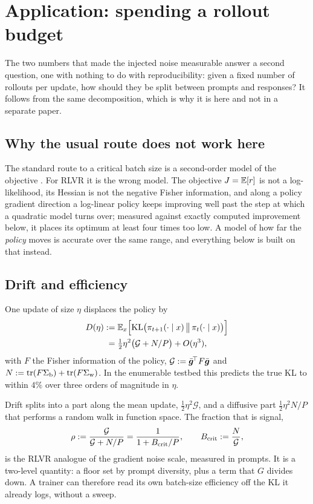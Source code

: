 \section{Application: spending a rollout budget}
\label{sec:applications}

The two numbers that made the injected noise measurable answer a second question, one with nothing
to do with reproducibility: given a fixed number of rollouts per update, how should they be split
between prompts and responses? It follows from the same decomposition, which is why it is here and
not in a separate paper.
\label{sec:drift}

\subsection{Why the usual route does not work here}

The standard route to a critical batch size is a second-order model of the objective
\citep{mccandlish2018empirical}. For RLVR it is the wrong model. The objective $J = \mathbb{E}[r]$ is not a
log-likelihood, its Hessian is not the negative Fisher information, and along a policy gradient
direction a log-linear policy keeps improving well past the step at which a quadratic model turns
over; measured against exactly computed improvement below, it places its optimum at least four
times too low. A model of how far the \emph{policy} moves is accurate over
the same range, and everything below is built on that instead.

\subsection{Drift and efficiency}

One update of size $\eta$ displaces the policy by
\begin{align}
  \label{eq:drift}
  D(\eta) &:= \mathbb{E}_x\Big[ \mathrm{KL}\big( \pi_{t+1}(\cdot \mid x) \,\big\|\, \pi_t(\cdot \mid x) \big) \Big]
  \notag \\
  &\;= \tfrac{1}{2}\eta^2 \big( \mathcal{G} + N/P \big) + O(\eta^3),
\end{align}
with $F$ the Fisher information of the policy, $\mathcal{G} := \bar{\bm{g}}^{\!\top} F \bar{\bm{g}}$ and
$N := \operatorname{tr}(F\Sigma_{\mathrm{b}}) + \operatorname{tr}(F\Sigma_{\mathrm{w}})$. In the enumerable testbed this predicts the true KL to within $4\%$
over three orders of magnitude in $\eta$.

Drift splits into a part along the mean update, $\tfrac{1}{2}\eta^2\mathcal{G}$, and a diffusive
part $\tfrac{1}{2}\eta^2 N/P$ that performs a random walk in function space. The fraction that is
signal,
\begin{equation}
  \label{eq:efficiency}
  \rho := \frac{\mathcal{G}}{\mathcal{G} + N/P} = \frac{1}{1 + B_{\mathrm{crit}}/P},
  \qquad
  B_{\mathrm{crit}} := \frac{N}{\mathcal{G}},
\end{equation}
is the RLVR analogue of the gradient noise scale, measured in prompts. It is a two-level quantity:
a floor set by prompt diversity, plus a term that $G$ divides down. A trainer can therefore read its
own batch-size efficiency off the KL it already logs, without a sweep.

